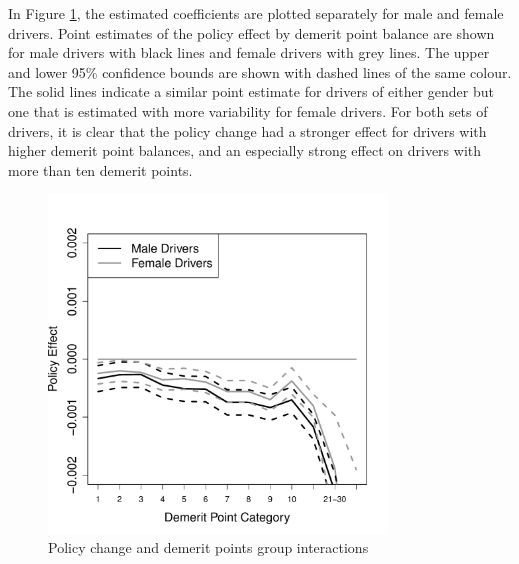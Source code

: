 \documentclass[12pt]{paper}
\begin{document}







In Figure \ref{fig:FE_regs_all_pts}, the estimated coefficients are plotted separately for male and female drivers. 
Point estimates of the policy effect by demerit point balance are shown for male drivers with black lines and female drivers with grey lines. 
The upper and lower 95\% confidence bounds are shown with dashed lines of the same colour. 
The solid lines indicate a similar point estimate for drivers of either gender but one that is estimated with more variability for female drivers. 
For both sets of drivers, it is clear that the policy change had a stronger effect for drivers with 
higher demerit point balances, and an especially strong effect on drivers with more than ten demerit points. 



\begin{figure}
\centering
\includegraphics[width=0.8\textwidth]{../Figures/FFX_reg_policy_points_grp_all_pts.pdf}
\caption{Policy change and demerit points group interactions}
% 
\label{fig:FE_regs_all_pts}
\end{figure}
\end{document}
